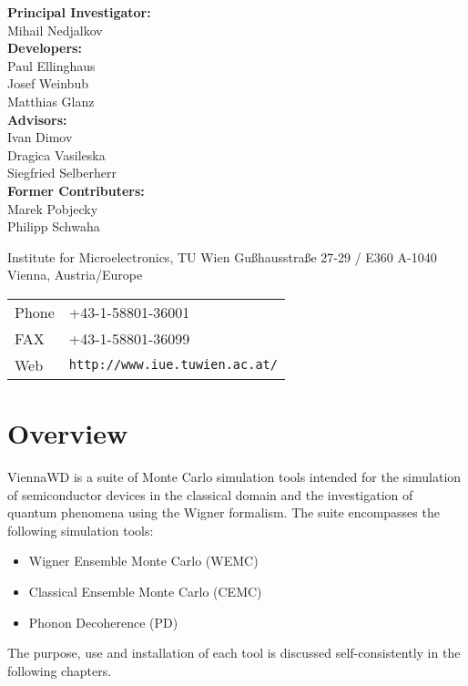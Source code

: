\documentclass[11pt]{report}
\begin{document}
\vspace{3.5cm}

\textbf{Principal Investigator:}\\
Mihail Nedjalkov\\

\textbf{Developers:}\\
Paul Ellinghaus\\
Josef Weinbub\\
Matthias Glanz\\

\textbf{Advisors:}\\
Ivan Dimov\\
Dragica Vasileska\\
Siegfried Selberherr\\

\textbf{Former Contributers:}\\
Marek Pobjecky\\
Philipp Schwaha\\



\vspace{7.0cm}

Institute for Microelectronics, TU Wien\newline
Gu\ss hausstra\ss e 27-29 / E360\newline
A-1040 Vienna, Austria/Europe\newline

\begin{tabular}{ll}
Phone  & +43-1-58801-36001\\
FAX    & +43-1-58801-36099\\
Web    & \texttt{http://www.iue.tuwien.ac.at/}
\end{tabular}

\setcounter{tocdepth}{3}
\tableofcontents
{}

\clearpage
{}


\chapter{Overview}   %
ViennaWD is a suite of Monte Carlo simulation tools intended for the simulation of semiconductor devices in the classical domain and the investigation of quantum phenomena using the Wigner formalism. The suite encompasses the following simulation tools:
\begin{itemize}
  \item Wigner Ensemble Monte Carlo (WEMC)
  \item Classical Ensemble Monte Carlo (CEMC)
  \item Phonon Decoherence (PD)
\end{itemize}
The purpose, use and installation of each tool is discussed self-consistently in the following chapters.
\end{document}
